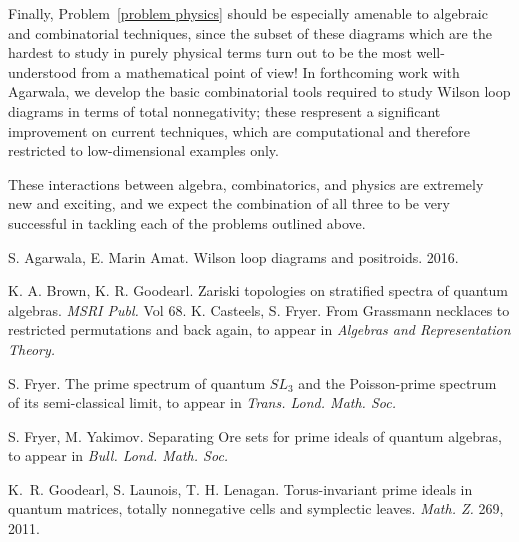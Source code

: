 \documentclass[11pt]{amsart}
\theoremstyle{definition}
\numberwithin{equation}{theorem}
\begin{document}
Finally, Problem~\ref{problem physics} should be especially amenable to algebraic and combinatorial techniques, since the subset of these diagrams which are the hardest to study in purely physical terms turn out to be the most well-understood from a mathematical point of view!  In forthcoming work with Agarwala, we develop the basic combinatorial tools required to study Wilson loop diagrams in terms of total nonnegativity; these respresent a significant improvement on current techniques, which are computational and therefore restricted to low-dimensional examples only.

These interactions between algebra, combinatorics, and physics are extremely new and exciting, and we expect the combination of all three to be very successful in tackling each of the problems outlined above.  





%
% 

\begin{thebibliography}{1}

S. Agarwala, E. Marin Amat.
\newblock Wilson loop diagrams and positroids.
 2016.

K. A. Brown, K. R. Goodearl.
\newblock Zariski topologies on stratified spectra of quantum algebras.
\newblock \textit{MSRI Publ.} Vol 68.
K. Casteels, S. Fryer.
\newblock From Grassmann necklaces to restricted permutations and back again,
\newblock to appear in {\em Algebras and Representation Theory.}

S. Fryer.
\newblock The prime spectrum of quantum {$SL_3$} and the {P}oisson-prime
  spectrum of its semi-classical limit,
\newblock to appear in {\em  Trans. Lond. Math. Soc.}

S. Fryer, M. Yakimov.
\newblock Separating Ore sets for prime ideals of quantum algebras,
\newblock  to appear in {\em Bull. Lond. Math. Soc.}


K.~R. Goodearl, S. Launois, T. H. Lenagan.
\newblock Torus-invariant prime ideals in quantum matrices, totally nonnegative cells and symplectic leaves.
\newblock \textit{Math. Z.} 269, 2011.


\end{thebibliography}
\end{document}
